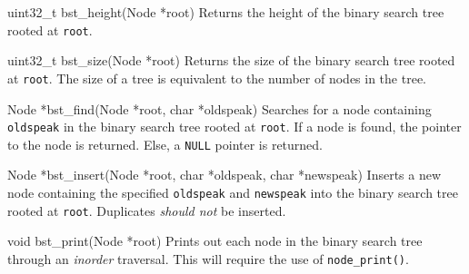 \begin{funcdoc}{uint32\_t bst\_height(Node *root)}\label{bstheight}
  Returns the height of the binary search tree rooted at \texttt{root}.
\end{funcdoc}

\begin{funcdoc}{uint32\_t bst\_size(Node *root)}\label{bstsize}
  Returns the size of the binary search tree rooted at \texttt{root}.
  The size of a tree is equivalent to the number of nodes in the tree.
\end{funcdoc}

\begin{funcdoc}{Node *bst\_find(Node *root, char *oldspeak)}
  Searches for a node containing \texttt{oldspeak} in the binary search
  tree rooted at \texttt{root}. If a node is found, the pointer to the
  node is returned. Else, a \texttt{NULL} pointer is returned.
\end{funcdoc}

\begin{funcdoc}{Node *bst\_insert(Node *root, char *oldspeak, char *newspeak)}
  Inserts a new node containing the specified \texttt{oldspeak} and
  \texttt{newspeak} into the binary search tree rooted at \texttt{root}.
  Duplicates \emph{should not} be inserted.
\end{funcdoc}

\begin{funcdoc}{void bst\_print(Node *root)}
  Prints out each node in the binary search tree through an
  \emph{inorder} traversal. This will require the use of
  \texttt{node\_print()}.
\end{funcdoc}
